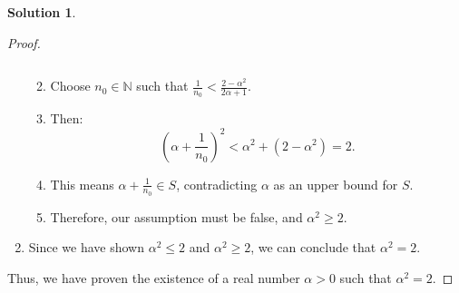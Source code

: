 \documentclass[12pt]{article}
\theoremstyle{definition} %
\newtheorem{solution}{Solution}
\theoremstyle{plain} %
\begin{document}
\begin{solution}
\begin{proof}
\begin{enumerate}
\begin{enumerate}
$$                $$
                \item Choose $n_0 \in \mathbb{N}$ such that $\frac{1}{n_0} < \frac{2 - \alpha^2}{2\alpha + 1}$.
                \item Then:
                $$
                \left( \alpha + \frac{1}{n_0} \right)^2 < \alpha^2 + (2 - \alpha^2) = 2.
                $$
                \item This means $\alpha + \frac{1}{n_0} \in S$, contradicting $\alpha$ as an upper bound for $S$.
                \item Therefore, our assumption must be false, and $\alpha^2 \geq 2$.
            \end{enumerate}
            \item Since we have shown $\alpha^2 \leq 2$ and $\alpha^2 \geq 2$, we can conclude that $\alpha^2 = 2$.
        \end{enumerate}
        
        Thus, we have proven the existence of a real number $\alpha > 0$ such that $\alpha^2 = 2$. 
        
    \end{proof}
\end{solution}
\end{document}
